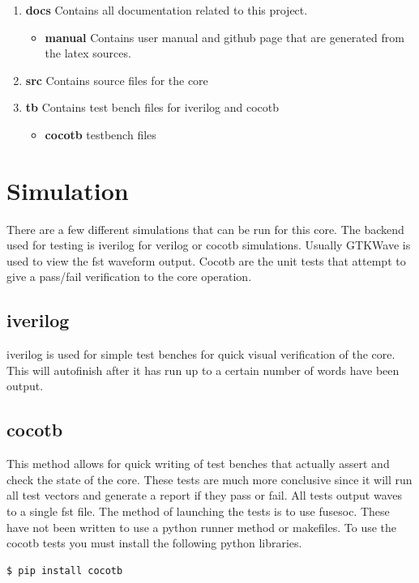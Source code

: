 \begin{enumerate}
  \item \textbf{docs} Contains all documentation related to this project.
    \begin{itemize}
      \item \textbf{manual} Contains user manual and github page that are generated from the latex sources.
    \end{itemize}
  \item \textbf{src} Contains source files for the core
  \item \textbf{tb} Contains test bench files for iverilog and cocotb
    \begin{itemize}
      \item \textbf{cocotb} testbench files
    \end{itemize}
\end{enumerate}

\newpage

\section{Simulation}
\par
There are a few different simulations that can be run for this core. The backend used for testing is iverilog for verilog or cocotb simulations. Usually GTKWave is used to view the fst waveform output. Cocotb are the unit tests that attempt to give a pass/fail verification to the core operation.

\subsection{iverilog}
\par
iverilog is used for simple test benches for quick visual verification of the core. This will autofinish after it has
run up to a certain number of words have been output.

\subsection{cocotb}
\par
This method allows for quick writing of test benches that actually assert and check the state of the core.
These tests are much more conclusive since it will run all test vectors and generate a report if they
pass or fail. All tests output waves to a single fst file. The method of launching the tests is to use
fusesoc. These have not been written to use a python runner method or makefiles.
To use the cocotb tests you must install the following python libraries.
\begin{lstlisting}[language=bash]
  $ pip install cocotb
\end{lstlisting}

